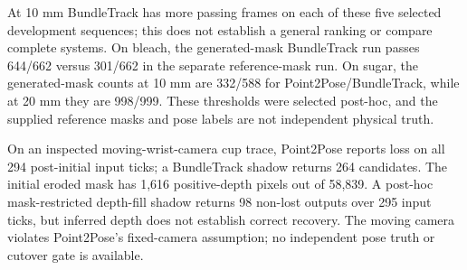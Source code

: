 \documentclass[10pt,journal]{IEEEtran}
\begin{document}
At 10 mm BundleTrack has more passing frames on each of these five selected development sequences; this does not establish a general ranking or compare complete systems. On bleach, the generated-mask BundleTrack run passes 644/662 versus 301/662 in the separate reference-mask run. On sugar, the generated-mask counts at 10 mm are 332/588 for Point2Pose/BundleTrack, while at 20 mm they are 998/999. These thresholds were selected post-hoc, and the supplied reference masks and pose labels are not independent physical truth.

\begin{table}[t]
\centering
\caption{Shared Point2Pose-generated-mask development runs. $n$ excludes initialization; 10 and 20 are post-hoc ADD-S thresholds in mm, with reported failures included. The methods share the saved mask source but differ in internal handling.}
\label{tab:generated}

\end{table}

On an inspected moving-wrist-camera cup trace, Point2Pose reports loss on all 294 post-initial input ticks; a BundleTrack shadow returns 264 candidates. The initial eroded mask has 1,616 positive-depth pixels out of 58,839. A post-hoc mask-restricted depth-fill shadow returns 98 non-lost outputs over 295 input ticks, but inferred depth does not establish correct recovery. The moving camera violates Point2Pose's fixed-camera assumption; no independent pose truth or cutover gate is available.
\end{document}

